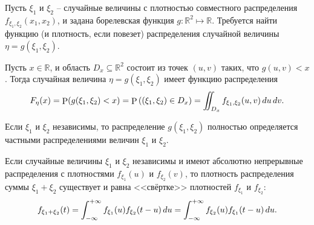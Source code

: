 Пусть $\xi_1$ и $\xi_2$ -- случайные величины с плотностью совместного распределения $f_{\xi_1, \xi_2} (x_1, x_2)$, и задана борелевская функция $g \colon  \mathbb{R}^2 \mapsto \mathbb{R}$. Требуется найти функцию (и плотность, если повезет) распределения случайной величины $\eta = g(\xi_1, \xi_2)$. 

\begin{to_thr}[]
    Пусть $x \in \mathbb{R}$, и область $D_x \subseteq \mathbb{R}^2$ состоит из точек $(u, v)$ таких, что $g(u, v) < x$. Тогда случайная величина $\eta = g(\xi_1, \xi_2)$ имеет функцию распределения
    \begin{equation*}
        F_\eta (x) = \mathop{\mathrm{P}}\nolimits (g(\xi_1, \xi_2) < x) = \mathop{\mathrm{P}}\nolimits \left((\xi_1, \xi_2) \in D_x\right) = \iint_{D_x} f_{\xi_1, \xi_2} (u, v) \, d u \, d v.
    \end{equation*}
\end{to_thr}

Если $\xi_1$ и $\xi_2$ независимы, то распределение $g(\xi_1, \xi_2)$ полностью определяется частными распределениями величин $\xi_1$ и $\xi_2$.

\begin{to_thr}
    Если случайные величины $\xi_1$ и $\xi_2$ независимы и имеют абсолютно непрерывные распределения с плотностями $f_{\xi_1} (u)$ и $f_{\xi_2} (v)$, то плотность распределения суммы $\xi_1 + \xi_2$ существует и равна <<свёртке>> плотностей $f_{\xi_1}$ и $f_{\xi_2}$:
    \begin{equation}
        f_{\xi_1 + \xi_2} (t) = \int_{-\infty}^{+\infty} f_{\xi_1} (u) f_{\xi_2} (t-u) \, d u =
        \int_{-\infty}^{+\infty}  f_{\xi_2} (u) f_{\xi_1} (t-u) \, d u.
    \end{equation}
\end{to_thr}